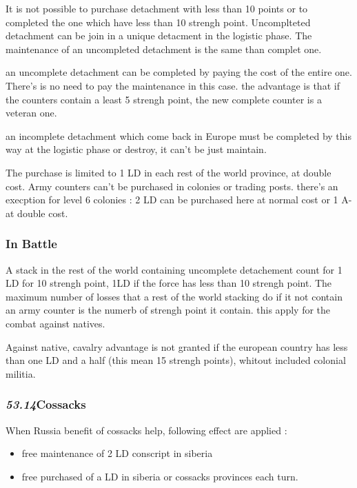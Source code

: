 It is not possible to purchase detachment with less than 10 points or to
completed the one which have less than 10 strengh point. Uncomplteted
detachment can be join in a unique detacment in the logistic phase. The
maintenance of an uncompleted detachment is the same than complet one. 

an uncomplete detachment can be completed by paying the cost of the entire
one. There's is no need to pay the maintenance in this case. the advantage
is that if the counters contain a least 5 strengh point, the new complete
counter is a veteran one.

an incomplete detachment which come back in Europe must be completed by 
this way at the logistic phase or destroy, it can't be just maintain.     

The purchase is limited to 1 LD in each rest of the world province, at   
double cost.  Army counters can't be purchased in colonies or trading
posts. there's an execption for level 6 colonies : 2 LD can be purchased
here at normal cost or 1 A- at double cost.

\subsubsection{In Battle}
A stack in the rest of the world containing uncomplete detachement count
for 1 LD for 10 strengh point, 1LD if the force has less than 10 strengh
point. The maximum number of losses that a rest of the world stacking do
if it not contain an army counter is the numerb of strengh point it
contain. this apply for the combat against natives.

Against native, cavalry advantage is not granted if the european country 
has less than one LD and a half (this mean 15 strengh points), whitout
included colonial militia.

\subsubsection{\textit{53.14}Cossacks}
When Russia benefit of cossacks help, following effect are applied :    
\begin{itemize}
\item free maintenance of 2 LD conscript in siberia
\item free purchased of a LD in siberia or cossacks provinces each turn. 
\end{itemize}

%
